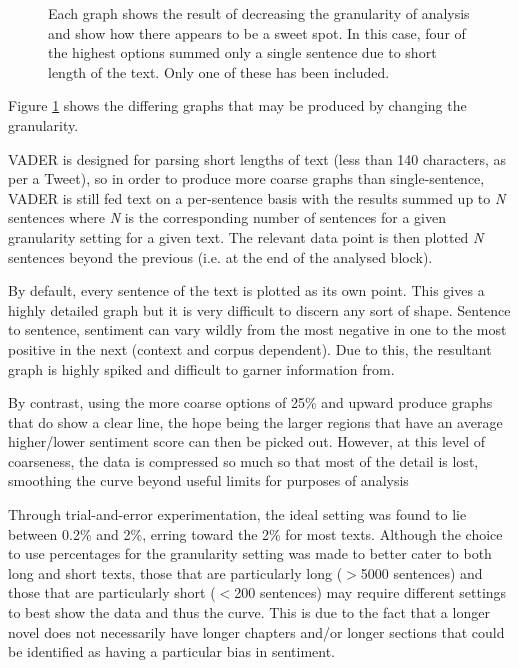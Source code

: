 \documentclass{article}
\begin{document}
{\begin{figure}
            \centering
            \caption{Each graph shows the result of decreasing the granularity of analysis and show how there appears to be a sweet spot. In this case, four of the highest options summed only a single sentence due to short length of the text. Only one of these has been included.}
            \label{fig:cinderellaGran}
        \end{figure}
        Figure \ref{fig:cinderellaGran} shows the differing graphs that may be produced by changing the granularity.

        VADER is designed for parsing short lengths of text (less than 140 characters, as per a Tweet), so in order to produce more coarse graphs than single-sentence, VADER is still fed text on a per-sentence basis with the results summed up to \textit{N} sentences where \textit{N} is the corresponding number of sentences for a given granularity setting for a given text. The relevant data point is then plotted \textit{N} sentences beyond the previous (i.e. at the end of the analysed block).

        By default, every sentence of the text is plotted as its own point. This gives a highly detailed graph but it is very difficult to discern any sort of shape. Sentence to sentence, sentiment can vary wildly from the most negative in one to the most positive in the next (context and corpus dependent). Due to this, the resultant graph is highly spiked and difficult to garner information from.

        By contrast, using the more coarse options of 25\% and upward produce graphs that do show a clear line, the hope being the larger regions that have an average higher/lower sentiment score can then be picked out. However, at this level of coarseness, the data is compressed so much so that most of the detail is lost, smoothing the curve beyond useful limits for purposes of analysis

        Through trial-and-error experimentation, the ideal setting was found to lie between 0.2\% and 2\%, erring toward the 2\% for most texts. Although the choice to use percentages for the granularity setting was made to better cater to both long and short texts, those that are particularly long ($>$5000 sentences) and those that are particularly short ($<$200 sentences) may require different settings to best show the data and thus the curve. This is due to the fact that a longer novel does not necessarily have longer chapters and/or longer sections that could be identified as having a particular bias in sentiment.
        
}
\end{document}
